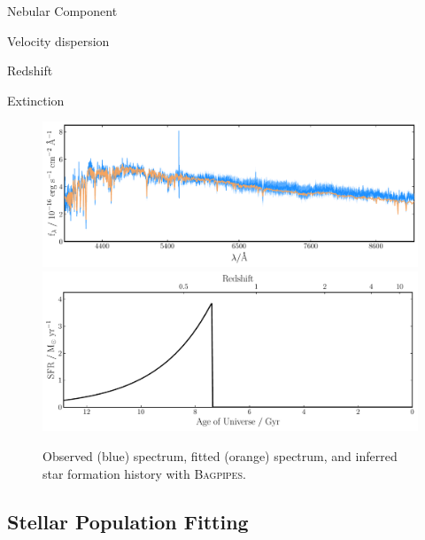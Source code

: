 \documentclass[a4paper,11pt]{article}
\begin{document}
Nebular Component

Velocity dispersion

Redshift

Extinction

\begin{figure}
  \includegraphics[width=\textwidth]{host_hyz_specwerr_fit}
  \includegraphics[width=\textwidth]{host_hyz_specwerr_sfh}
  \caption{Observed (blue) spectrum, fitted (orange) spectrum, and inferred star formation history with \textsc{Bagpipes}.}
  \label{fig:bagpipes_example_fit}
\end{figure}

\subsection{Stellar Population Fitting}\label{sec:stellar_population_fitting}
\end{document}
